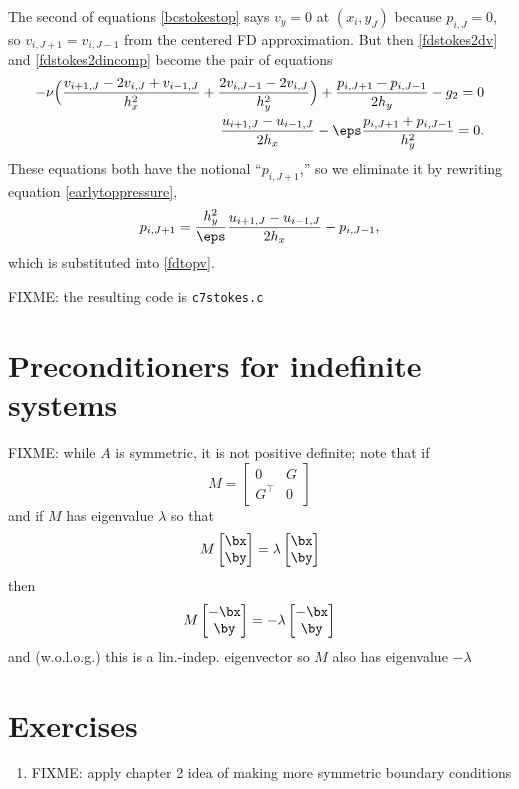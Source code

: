 The second of equations \eqref{bcstokestop} says $v_y=0$ at $(x_i,y_J)$ because $p_{i,J}=0$, so $v_{i,J+1} = v_{i,J-1}$ from the centered FD approximation.  But then \eqref{fdstokes2dv} and \eqref{fdstokes2dincomp} become the pair of equations
\begin{align}
-\nu \Big(\frac{v_{i+1,J} - 2 v_{i,J} + v_{i-1,J}}{h_x^2} + \frac{2 v_{i,J-1} - 2 v_{i,J}}{h_y^2}\Big) + \frac{p_{i,J+1}-p_{i,J-1}}{2h_y} - g_2 = 0 \label{fdtopv} \\
\frac{u_{i+1,J}-u_{i-1,J}}{2h_x}  - \eps \frac{p_{i,J+1} + p_{i,J-1}}{h_y^2} = 0. \label{earlytoppressure}
\end{align}
These equations both have the notional ``$p_{i,J+1}$,'' so we eliminate it by rewriting equation \eqref{earlytoppressure},
\begin{equation}
p_{i,J+1} = \frac{h_y^2}{\eps} \frac{u_{i+1,J}-u_{i-1,J}}{2h_x} - p_{i,J-1},\label{fdtoppressureelim}
\end{equation}
which is substituted into \eqref{fdtopv}.

FIXME: the resulting code is \texttt{c7stokes.c}


\section{Preconditioners for indefinite systems}

FIXME: while $A$ is symmetric, it is not positive definite; note that if
    $$M = \begin{bmatrix} 0 & G \\ G^\top & 0 \end{bmatrix}$$
and if $M$ has eigenvalue $\lambda$ so that
    $$M \begin{bmatrix} \bx \\ \by \end{bmatrix} = \lambda \begin{bmatrix} \bx \\ \by \end{bmatrix}$$
then
    $$M \begin{bmatrix} -\bx \\ \by \end{bmatrix} = - \lambda \begin{bmatrix} -\bx \\ \by \end{bmatrix}$$
and (w.o.l.o.g.) this is a lin.-indep. eigenvector so $M$ also has eigenvalue $-\lambda$







\section{Exercises}

\renewcommand{\labelenumi}{\arabic{chapter}.\arabic{enumi}\quad}
\begin{enumerate}
\item FIXME: apply chapter 2 idea of making more symmetric boundary conditions
\end{enumerate}